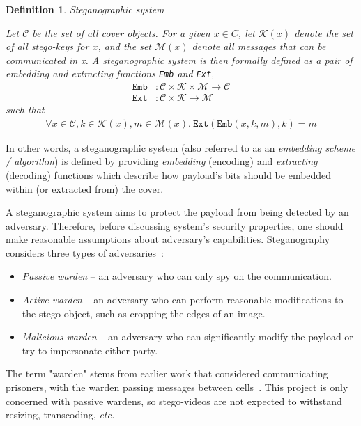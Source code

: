 \documentclass[12pt,british,twoside,notitlepage,usenames,dvipsnames,hypens,final]{report}
\newtheorem{definition}{Definition}
\numberwithin{equation}{section}
\numberwithin{figure}{section}
\begin{document}
\begin{definition}{Steganographic system~\cite[p.~53]{fridrich}}

Let $\mathcal{C}$ be the set of all cover objects. For a given $x \in C$, let $\mathcal{K}(x)$ denote the set of all stego-keys for $x$, and the set $\mathcal{M}(x)$ denote all messages that can be communicated in x. A steganographic system is then formally defined as a pair of embedding and extracting functions \texttt{Emb} and \texttt{Ext},
\begin{align*}
\texttt{Emb} &: \mathcal{C} \times \mathcal{K} \times \mathcal{M} \rightarrow \mathcal{C} \\
\texttt{Ext} &: \mathcal{C} \times \mathcal{K} \rightarrow \mathcal{M}
\end{align*}
\vspace{-1mm}
such that
\vspace{-1mm}
\begin{align*}
\forall x \in \mathcal{C}, k \in \mathcal{K}(x), m \in \mathcal{M}(x) . ~ \texttt{Ext}(\texttt{Emb}(x, k, m), k) = m
\end{align*}

\end{definition}

In other words, a steganographic system (also referred to as an \emph{embedding scheme / algorithm}) is defined by providing \emph{embedding} (encoding) and \emph{extracting} (decoding) functions which describe how payload's bits should be embedded within (or extracted from) the cover.

A steganographic system aims to protect the payload from being detected by an adversary. Therefore, before discussing system's security properties, one should make reasonable assumptions about adversary's capabilities. Steganography considers three types of adversaries~\cite{craver1998public}:
\begin{itemize}
\item \emph{Passive warden} -- an adversary who can only spy on the communication.
\item \emph{Active warden} -- an adversary who can perform reasonable modifications to the stego-object, such as cropping the edges of an image.
\item \emph{Malicious warden} -- an adversary who can significantly modify the payload or try to impersonate either party.
\end{itemize}
The term "warden" stems from earlier work that considered communicating prisoners, with the warden passing messages between cells~\cite{craver1998public}. This project is only concerned with passive wardens, so stego-videos are not expected to withstand resizing, transcoding, \emph{etc.}
\end{document}
